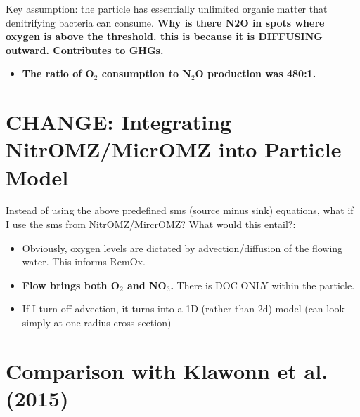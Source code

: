 \documentclass{article}
\begin{document}
Key assumption: the particle has essentially unlimited organic matter that denitrifying bacteria can consume.
\textbf{Why is there N2O in spots where oxygen is above the threshold. this is because it is DIFFUSING outward. Contributes to GHGs.}

\begin{itemize}
    \item \textbf{The ratio of O$_2$ consumption to N$_2$O production was 480:1.}


\end{itemize}




\section{CHANGE: Integrating NitrOMZ/MicrOMZ into Particle Model}
Instead of using the above predefined sms (source minus sink) equations, what if I use the sms from NitrOMZ/MircrOMZ? What would this entail?:
\begin{itemize}
    \item Obviously, oxygen levels are dictated by advection/diffusion of the flowing water. This informs RemOx.
    \item \textbf{Flow brings both O$_2$ and NO$_3$.} There is DOC ONLY within the particle.
    \item If I turn off advection, it turns into a 1D (rather than 2d) model (can look simply at one radius cross section)
\end{itemize}

\section{Comparison with Klawonn et al. (2015)}
\end{document}
